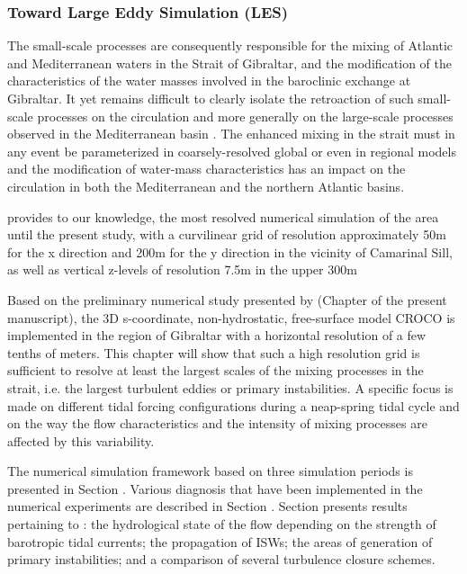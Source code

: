 \subsubsection{Toward Large Eddy Simulation (LES)}

The small-scale processes are consequently responsible for the mixing of Atlantic and Mediterranean waters in the Strait of Gibraltar, and the modification of the characteristics of the water masses involved in the baroclinic exchange at Gibraltar. It yet remains difficult to clearly isolate the retroaction of such small-scale processes on the circulation and more generally on the large-scale processes observed in the Mediterranean basin \citep{garcia-lafuente_2017}.
The enhanced mixing in the strait must in any event be parameterized in coarsely-resolved global or even in regional models and the modification of water-mass characteristics has an impact on the circulation in both the Mediterranean and the northern Atlantic basins. 

\citet{sanchez-garrido_2011} provides to our knowledge, the most resolved numerical simulation of the area until the present study, with a curvilinear grid of resolution approximately 50m for the x direction and 200m for the y direction in the vicinity of Camarinal Sill, as well as vertical z-levels of resolution 7.5m in the upper 300m

Based on the preliminary numerical study presented by \citet{hilt_2020} (Chapter  of the present manuscript), the 3D s-coordinate, non-hydrostatic, free-surface model CROCO is implemented in the region of Gibraltar with a horizontal resolution of a few tenths of meters. This chapter will show that such a high resolution grid is sufficient to resolve at least the largest scales of the mixing processes in the strait, i.e. the largest turbulent eddies or primary instabilities. A specific focus is made on different tidal forcing configurations during a neap-spring tidal cycle and on the way the flow characteristics and the intensity of mixing processes are affected by this variability. 

The numerical simulation framework based on three simulation periods is presented in Section . Various diagnosis that have been implemented in the numerical experiments are described in Section . Section  presents results pertaining to : the hydrological state of the flow depending on the strength of barotropic tidal currents; the propagation of ISWs; the areas of generation of primary instabilities; and a comparison of several turbulence closure schemes.

